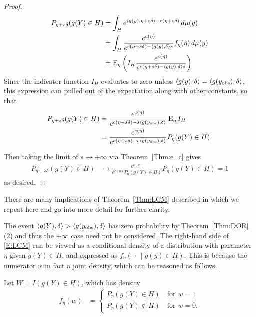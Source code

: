 \begin{proof}
\begin{align*}
 P_{\eta+s\delta}(g(Y) \in H) &= \int_H e^{\langle g(y), \eta+s\delta \rangle - c(\eta
+s\delta)} \, d\mu(y) \\
		&= \int_H  \frac{e^{c(\eta)}}{e^{c(\eta+s\delta)-\langle g(y),\delta \rangle s}} 
					f_\eta(\eta) \, d\mu(y)\\
		&= \operatorname{E}_\eta  \left ( I_H \frac{e^{c(\eta)}}{e^{c(\eta+s\delta)-\langle g(y),\delta \rangle s}} \right )
\end{align*}
Since the indicator function $I_H$ evaluates to zero unless 
$\langle  g(y), \delta \rangle = \langle  g(y_{\text{obs}}), \delta \rangle $,  
this expression can pulled out of the expectation along with other constants, so that 
\begin{align*}
		 P_{\eta+s\delta}(g(Y) \in H)
		 &= \frac{e^{c(\eta)} }{ e^{ c(\eta+s\delta) -s\langle g(y_{\text{obs}}),\delta \rangle } }
		 \operatorname{E}_\eta  I_H   \\
		 &= \frac{e^{c(\eta)} }{ e^{ c(\eta+s\delta) -s\langle g(y_{\text{obs}}),\delta \rangle } }
		 P_\eta  (g(Y) \in H). 
		 \end{align*}
 
Then taking the limit of $s \to +\infty$ via Theorem~\ref{Thm:e_c} gives
\begin{align*}
 P_{\eta+s\delta}(g(Y) \in H)
		&\to \frac{e^{c(\eta)}}{ e^{c(\eta)} P_\eta (g(Y) \in H) } P_\eta (g(Y)\in H) = 1
 \end{align*}
 as desired.   
\end{proof}


There are many implications of Theorem~\ref{Thm:LCM} described in \citep{Geyer:gdor}
which we repeat here and go into more detail for further clarity.

The event $\langle g(Y),\delta \rangle > \langle g(y_{\text{obs}}),\delta \rangle$ has zero probability by 
Theorem~\ref{Thm:DOR}(2) and thus the $+\infty$ case need not be considered.
The right-hand side of \eqref{E:LCM} can be viewed as a conditional density of a 
distribution with parameter $\eta$ given $g(Y) \in H$, and expressed as $f_{\eta}
(\, \cdot\,  \mid g(y) \in H)$.  This is because the numerator
is in fact a joint density, which can be reasoned as follows.

Let $W = I(g(Y) \in H)$, which has density 
\begin{align*}
	f_\eta(w) &= \begin{cases}
					P_\eta(g(Y) \in H) \quad \text{for $w=1$} \\
					P_\eta(g(Y) \notin H) \quad \text{for $w=0$}.
				\end{cases}
\end{align*}

